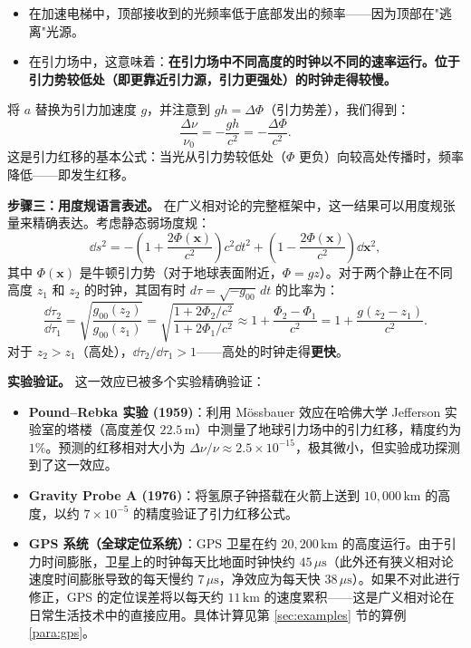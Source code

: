 \begin{itemize}
    \item 在加速电梯中，顶部接收到的光频率低于底部发出的频率——因为顶部在"逃离"光源。
    \item 在引力场中，这意味着：\textbf{在引力场中不同高度的时钟以不同的速率运行。位于引力势较低处（即更靠近引力源，引力更强处）的时钟走得较慢。}
\end{itemize}

将 $a$ 替换为引力加速度 $g$，并注意到 $gh = \Delta \Phi$（引力势差），我们得到：
\begin{equation}
    \boxed{\frac{\Delta \nu}{\nu_0} = -\frac{g h}{c^2} = -\frac{\Delta \Phi}{c^2}}.
\end{equation}
这是引力红移的基本公式：当光从引力势较低处（$\Phi$ 更负）向较高处传播时，频率降低——即发生红移。

\medskip

\noindent\textbf{步骤三：用度规语言表述。} 在广义相对论的完整框架中，这一结果可以用度规张量来精确表达。考虑静态弱场度规：
\begin{equation}
    \dd s^2 = -\left(1 + \frac{2\Phi(\mathbf{x})}{c^2}\right) c^2 \dd t^2 + \left(1 - \frac{2\Phi(\mathbf{x})}{c^2}\right) \dd \mathbf{x}^2,
\end{equation}
其中 $\Phi(\mathbf{x})$ 是牛顿引力势（对于地球表面附近，$\Phi = gz$）。对于两个静止在不同高度 $z_1$ 和 $z_2$ 的时钟，其固有时 $d\tau = \sqrt{-g_{00}}\,dt$ 的比率为：
\begin{equation}
    \frac{\dd \tau_2}{\dd \tau_1} = \sqrt{\frac{g_{00}(z_2)}{g_{00}(z_1)}} = \sqrt{\frac{1 + 2\Phi_2/c^2}{1 + 2\Phi_1/c^2}} \approx 1 + \frac{\Phi_2 - \Phi_1}{c^2} = 1 + \frac{g(z_2 - z_1)}{c^2}.
\end{equation}
对于 $z_2 > z_1$（高处），$\dd\tau_2 / \dd\tau_1 > 1$——高处的时钟走得\textbf{更快}。

\medskip

\noindent\textbf{实验验证。} 这一效应已被多个实验精确验证：
\begin{itemize}
    \item \textbf{Pound--Rebka 实验 (1959)}：利用 M\"ossbauer 效应在哈佛大学 Jefferson 实验室的塔楼（高度差仅 $22.5\,\text{m}$）中测量了地球引力场中的引力红移，精度约为 $1\%$。预测的红移相对大小为 $\Delta \nu / \nu \approx 2.5 \times 10^{-15}$，极其微小，但实验成功探测到了这一效应。
    \item \textbf{Gravity Probe A (1976)}：将氢原子钟搭载在火箭上送到 $10{,}000\,\text{km}$ 的高度，以约 $7\times 10^{-5}$ 的精度验证了引力红移公式。
    \item \textbf{GPS 系统（全球定位系统）}：GPS 卫星在约 $20{,}200\,\text{km}$ 的高度运行。由于引力时间膨胀，卫星上的时钟每天比地面时钟快约 $45\,\mu\text{s}$（此外还有狭义相对论速度时间膨胀导致的每天慢约 $7\,\mu\text{s}$，净效应为每天快 $38\,\mu\text{s}$）。如果不对此进行修正，GPS 的定位误差将以每天约 $11\,\text{km}$ 的速度累积——这是广义相对论在日常生活技术中的直接应用。具体计算见第 \ref{sec:examples} 节的算例 \ref{para:gps}。
\end{itemize}

